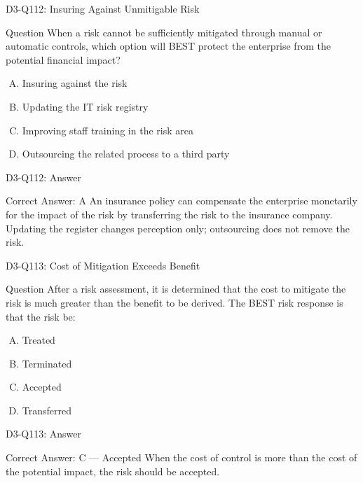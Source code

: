 \documentclass{beamer}
\begin{document}
	\begin{frame}{D3-Q112: Insuring Against Unmitigable Risk}
		\begin{block}{Question}
			When a risk cannot be sufficiently mitigated through manual or automatic controls, which option will BEST protect the enterprise from the potential financial impact?
		\end{block}
		\begin{enumerate}[(A)]
			\item Insuring against the risk
			\item Updating the IT risk registry
			\item Improving staff training in the risk area
			\item Outsourcing the related process to a third party
		\end{enumerate}
	\end{frame}
	\begin{frame}{D3-Q112: Answer}
		\begin{block}{Correct Answer: A}
			An insurance policy can compensate the enterprise monetarily for the impact of the risk by transferring the risk to the insurance company. Updating the register changes perception only; outsourcing does not remove the risk.
		\end{block}
	\end{frame}
	
	\begin{frame}{D3-Q113: Cost of Mitigation Exceeds Benefit}
		\begin{block}{Question}
			After a risk assessment, it is determined that the cost to mitigate the risk is much greater than the benefit to be derived. The BEST risk response is that the risk be:
		\end{block}
		\begin{enumerate}[(A)]
			\item Treated
			\item Terminated
			\item Accepted
			\item Transferred
		\end{enumerate}
	\end{frame}
	\begin{frame}{D3-Q113: Answer}
		\begin{block}{Correct Answer: C --- Accepted}
			When the cost of control is more than the cost of the potential impact, the risk should be accepted.
		\end{block}
	\end{frame}
	
\end{document}
